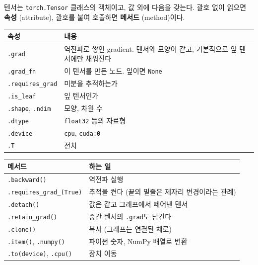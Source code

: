 \documentclass[11pt,a4paper]{article}
\begin{document}
텐서는 \texttt{torch.Tensor} 클래스의 객체이고, 값 외에 다음을 갖는다. 괄호 없이 읽으면 \textbf{속성} (attribute), 괄호를 붙여 호출하면 \textbf{메서드} (method)이다.
\begin{center}
\begin{tabular}{@{}lp{112mm}@{}}
\toprule
속성 & 내용 \\
\midrule
\texttt{.grad} & 역전파로 쌓인 gradient. 텐서와 모양이 같고, 기본적으로 잎 텐서에만 채워진다 \\
\texttt{.grad\_fn} & 이 텐서를 만든 노드. 잎이면 \texttt{None} \\
\texttt{.requires\_grad} & 미분을 추적하는가 \\
\texttt{.is\_leaf} & 잎 텐서인가 \\
\texttt{.shape}, \texttt{.ndim} & 모양, 차원 수 \\
\texttt{.dtype} & \texttt{float32} 등의 자료형 \\
\texttt{.device} & \texttt{cpu}, \texttt{cuda:0} \\
\texttt{.T} & 전치 \\
\bottomrule
\end{tabular}

\vspace{0.6em}
\begin{tabular}{@{}lp{112mm}@{}}
\toprule
메서드 & 하는 일 \\
\midrule
\texttt{.backward()} & 역전파 실행 \\
\texttt{.requires\_grad\_(True)} & 추적을 켠다 (끝의 밑줄은 제자리 변경이라는 관례) \\
\texttt{.detach()} & 값은 같고 그래프에서 떼어낸 텐서 \\
\texttt{.retain\_grad()} & 중간 텐서의 \texttt{.grad}도 남긴다 \\
\texttt{.clone()} & 복사 (그래프는 연결된 채로) \\
\texttt{.item()}, \texttt{.numpy()} & 파이썬 숫자, NumPy 배열로 변환 \\
\texttt{.to(device)}, \texttt{.cpu()} & 장치 이동 \\
\bottomrule
\end{tabular}
\end{center}
\end{document}
